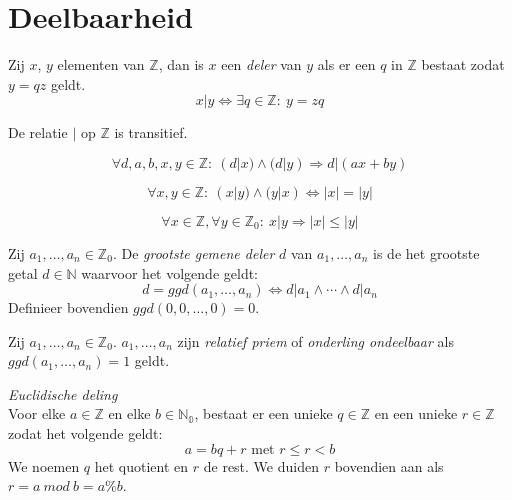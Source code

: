 \documentclass[main.tex]{subfiles}
\begin{document}
\chapter{Deelbaarheid}
\label{cha:deelbaarheid}

\begin{de}
  \label{de:deler}
  Zij $x$, $y$ elementen van $\mathbb{Z}$, dan is $x$ een \emph{deler} van $y$ als er een $q$ in $\mathbb{Z}$ bestaat zodat $y = qz$ geldt.
  \[ x | y \Leftrightarrow \exists q \in \mathbb{Z}:\ y= zq \]
\end{de}

\begin{ei}
  De relatie $|$ op $\mathbb{Z}$ is transitief.

\end{ei}

\begin{ei}
  \[ \forall d,a,b,x,y \in \mathbb{Z}:\ (d|x) \wedge (d|y) \Rightarrow d|(ax + by) \]

\end{ei}

\begin{ei}
  \[ \forall x,y \in \mathbb{Z}:\ (x|y) \wedge (y|x) \Leftrightarrow |x| = |y| \]

\end{ei}

\begin{ei}
  \[ \forall x \in \mathbb{Z}, \forall y \in \mathbb{Z}_{0}:\ x|y \Rightarrow |x| \le |y| \]

\end{ei}

\begin{de}
  Zij $a_{1},\dotsc,a_{n} \in \mathbb{Z}_{0}$. De \emph{grootste gemene deler} $d$ van $a_{1},\dotsc,a_{n}$ is de het grootste getal $d \in \mathbb{N}$ waarvoor het volgende geldt:
  \[ d = ggd(a_{1},\dotsc,a_{n}) \Leftrightarrow d|a_{1} \wedge \dotsb \wedge d|a_{n}\]
  Definieer bovendien $ggd(0,0,\dotsc,0) = 0$.   
\end{de}

\begin{de}
  Zij $a_{1},\dotsc,a_{n} \in \mathbb{Z}_{0}$.
  $a_{1},\dotsc,a_{n}$ zijn \emph{relatief priem} of \emph{onderling ondeelbaar} als $ggd(a_{1},\dotsc,a_{n}) = 1$ geldt.
\end{de}

\begin{st}
  \label{st:euclidische-deling}
  \emph{Euclidische deling}\\
  Voor elke $a \in \mathbb{Z}$ en elke $b \in \mathbb{N_{0}}$, bestaat er een unieke $q\in \mathbb{Z}$ en een unieke $r\in \mathbb{Z}$ zodat het volgende geldt:
  \[ a = bq + r \text{ met } r \le r < b \]
  We noemen $q$ het quotient en $r$ de rest.
  We duiden $r$ bovendien aan als $r = a\ mod\ b = a\%b$.

\end{st}
\end{document}
